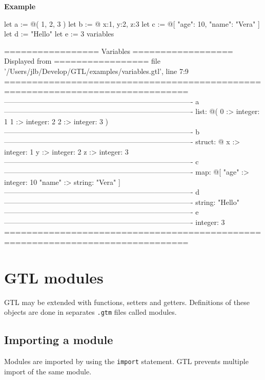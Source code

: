 \documentclass[10pt,openright,twosides]{report}
\newcommand{\gtlinline}[1]{\colorbox{light-blue}{\lstinline[language=gtl]{#1}}}
\newcommand{\example}{\vspace{.75em}\noindent\textbf{Example}\vspace{0em}}
\begin{document}
\example
\begin{gtl}
let a := @( 1, 2, 3 )
let b := @{ x:1, y:2, z:3 }
let c := @[ "age": 10, "name": "Vera" ]
let d := "Hello"
let e := 3
variables
\end{gtl}
\begin{console}
================= Variables ================== Displayed from =================
file '/Users/jlb/Develop/GTL/examples/variables.gtl', line 7:9
===============================================================================
-------------------------------------------------------------------------------
a
-------------------------------------------------------------------------------
list: @(
    0 :>
        integer: 1
    1 :>
        integer: 2
    2 :>
        integer: 3
)
-------------------------------------------------------------------------------
b
-------------------------------------------------------------------------------
struct: @{
    x :>
        integer: 1
    y :>
        integer: 2
    z :>
        integer: 3
}
-------------------------------------------------------------------------------
c
-------------------------------------------------------------------------------
map: @[
    "age" :>
        integer: 10
    "name" :>
        string: "Vera"
]
-------------------------------------------------------------------------------
d
-------------------------------------------------------------------------------
string: "Hello"
-------------------------------------------------------------------------------
e
-------------------------------------------------------------------------------
integer: 3
===============================================================================
\end{console}

\chapter{GTL modules}

GTL may be extended with functions, setters and getters. Definitions of these objects are done in  separates \texttt{\footnotesize .gtm} files called modules.

\section{Importing a module}

Modules are imported by using the \gtlinline{import} statement. GTL prevents multiple import of the same module.
\end{document}
